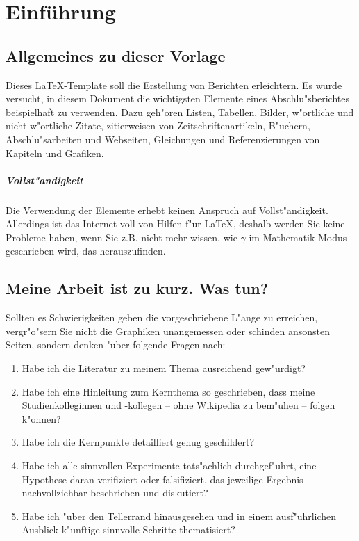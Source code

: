 \chapter{Einführung}
\label{chap:einfuehrung}

\section{Allgemeines zu dieser Vorlage}
\label{sec:Vorlage}
Dieses \LaTeX-Template soll die Erstellung von Berichten erleichtern. Es wurde versucht, in diesem Dokument die wichtigsten Elemente eines Abschlu"sberichtes beispielhaft zu verwenden.
Dazu geh"oren Listen, Tabellen, Bilder, w"ortliche und nicht-w"ortliche Zitate, zitierweisen von Zeitschriftenartikeln, B"uchern, Abschlu"sarbeiten und Webseiten, Gleichungen und Referenzierungen von Kapiteln und Grafiken.

\paragraph{Vollst"andigkeit}
Die Verwendung der Elemente erhebt keinen Anspruch auf Vollst"andigkeit.
Allerdings ist das Internet\cite{onlineLatexHilfe} voll von Hilfen f"ur \LaTeX, deshalb werden Sie keine Probleme haben, wenn Sie z.B. nicht mehr wissen, wie $\gamma$ im Mathematik-Modus geschrieben wird, das herauszufinden.


\section{Meine Arbeit ist zu kurz. Was tun?}
\label{sec:ZuKurz}

Sollten es Schwierigkeiten geben die vorgeschriebene L"ange zu erreichen, vergr"o"sern Sie nicht die Graphiken unangemessen oder schinden ansonsten Seiten, sondern denken "uber folgende Fragen nach:
\begin{enumerate}
\item Habe ich die Literatur zu meinem Thema ausreichend gew"urdigt?
\item Habe ich eine Hinleitung zum Kernthema so geschrieben, dass meine Studienkolleginnen und -kollegen -- ohne Wikipedia zu bem"uhen -- folgen k"onnen?
\item Habe ich die Kernpunkte detailliert genug geschildert?
\item Habe ich alle sinnvollen Experimente tats"achlich durchgef"uhrt, eine Hypothese daran verifiziert oder falsifiziert, das jeweilige Ergebnis nachvollziehbar beschrieben und diskutiert?
\item Habe ich "uber den Tellerrand hinausgesehen und in einem ausf"uhrlichen Ausblick k"unftige sinnvolle Schritte thematisiert?
\end{enumerate}



